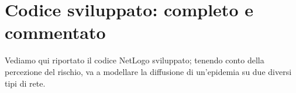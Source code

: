 \chapter{Codice sviluppato: completo e commentato}
\label{appendix:code}
Vediamo qui riportato il codice NetLogo sviluppato; tenendo conto della percezione del rischio, va a modellare la diffusione di un'epidemia su due diversi tipi di rete.
\begin{center}
	
\end{center}

%
